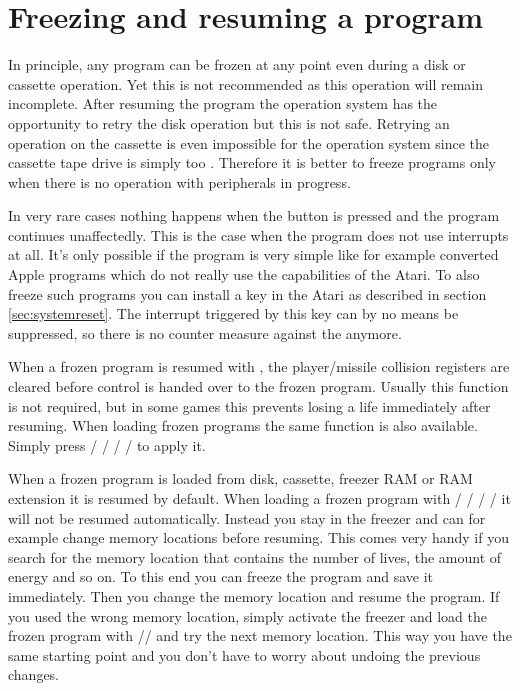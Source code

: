 \section{Freezing and resuming a program}

In principle, any program can be frozen at any point even during a disk or
cassette operation. Yet this is not recommended as this operation will remain
incomplete. After resuming the program the operation system has the opportunity
to retry the disk operation but this is not safe. Retrying an operation on the
cassette is even impossible for the operation system since the cassette tape
drive is simply too . Therefore it is better to freeze programs only
when there is no operation with peripherals in progress.

In very rare cases nothing happens when the  button is pressed and the
program continues unaffectedly. This is the case when the program does not use
interrupts at all. It's only possible if the program is very simple like for
example converted Apple programs which do not really use the capabilities of the
Atari. To also freeze such programs you can install a  key in
the Atari as described in section \ref{sec:systemreset}. The interrupt triggered
by this key can by no means be suppressed, so there is no counter measure
against the \frz anymore.

When a frozen program is resumed with , the player/missile collision
registers are cleared before control is handed over to the frozen program.
Usually this function is not required, but in some games this prevents losing a
life immediately after resuming. When loading frozen programs the same function
is also available. Simply press  /  /  /  /
 to apply it.

When a frozen program is loaded from disk, cassette, freezer RAM or RAM
extension it is resumed by default. When loading a frozen program with 
/  /  /  /  it will not be resumed
automatically. Instead you stay in the freezer and can for example change memory
locations before resuming. This comes very handy if you search for the memory location
that contains the number of lives, the amount of energy and so on. To this end
you can freeze the program and save it immediately. Then you change the memory
location and resume the program. If you used the wrong memory location, simply
activate the freezer and load the frozen program with //
and try the next memory location. This way you have the same starting point and
you don't have to worry about undoing the previous changes.

